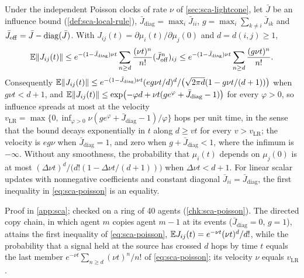 \begin{proposition}\label{prop:sca-poisson}
Under the independent Poisson clocks of rate $\nu$ of \cref{sec:sca-lightcone}, let $\bar J$ be an influence bound (\cref{def:sca-local-rule}), $\bar J_{\mathrm{diag}}=\max_i\bar J_{ii}$, $g=\max_i\sum_{k\neq i}\bar J_{ik}$ and $\bar J_{\mathrm{off}}=\bar J-\operatorname{diag}(\bar J)$. With $J_{ij}(t)=\partial\mu_i(t)/\partial\mu_j(0)$ and $d=d(i,j)\ge1$,
\begin{equation}\label{eq:sca-poisson}
\mathbb{E}\Vert J_{ij}(t)\Vert\le e^{-(1-\bar J_{\mathrm{diag}})\nu t}\sum_{n\ge d}\frac{(\nu t)^n}{n!}(\bar J_{\mathrm{off}}^n)_{ij}\le e^{-(1-\bar J_{\mathrm{diag}})\nu t}\sum_{n\ge d}\frac{(g\nu t)^n}{n!}.
\end{equation}
Consequently $\mathbb{E}\Vert J_{ij}(t)\Vert\le e^{-(1-\bar J_{\mathrm{diag}})\nu t}(eg\nu t/d)^d/\bigl(\sqrt{2\pi d}(1-g\nu t/(d+1))\bigr)$ when $g\nu t<d+1$, and $\mathbb{E}\Vert J_{ij}(t)\Vert\le\exp\bigl(-\varphi d+\nu t(ge^\varphi+\bar J_{\mathrm{diag}}-1)\bigr)$ for every $\varphi>0$, so influence spreads at most at the velocity $v_{\mathrm{LR}}=\max\bigl\{0,\inf_{\varphi>0}\nu(ge^\varphi+\bar J_{\mathrm{diag}}-1)/\varphi\bigr\}$ hops per unit time, in the sense that the bound decays exponentially in $t$ along $d\ge vt$ for every $v>v_{\mathrm{LR}}$; the velocity is $eg\nu$ when $\bar J_{\mathrm{diag}}=1$, and zero when $g+\bar J_{\mathrm{diag}}<1$, where the infimum is $-\infty$. Without any smoothness, the probability that $\mu_i(t)$ depends on $\mu_j(0)$ is at most $(\Delta\nu t)^d/\bigl(d!(1-\Delta\nu t/(d+1))\bigr)$ when $\Delta\nu t<d+1$. For linear scalar updates with nonnegative coefficients and constant diagonal $\bar J_{ii}=\bar J_{\mathrm{diag}}$, the first inequality in \eqref{eq:sca-poisson} is an equality.
\end{proposition}
Proof in \cref{app:sca}; checked on a ring of 40 agents (\cref{chk:sca-poisson}). The directed copy chain, in which agent $m$ copies agent $m-1$ at its events ($\bar J_{\mathrm{diag}}=0$, $g=1$), attains the first inequality of \eqref{eq:sca-poisson}, $\mathbb{E} J_{ij}(t)=e^{-\nu t}(\nu t)^d/d!$, while the probability that a signal held at the source has crossed $d$ hops by time $t$ equals the last member $e^{-\nu t}\sum_{n\ge d}(\nu t)^n/n!$ of \eqref{eq:sca-poisson}; its velocity $\nu$ equals $v_{\mathrm{LR}}$.

